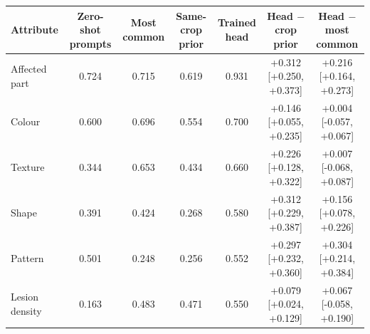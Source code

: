 \begin{tabular}{lcccccc}\toprule Attribute & Zero-shot prompts & Most common & Same-crop prior & Trained head & Head $-$ crop prior & Head $-$ most common\\\midrule
Affected part & 0.724 & 0.715 & 0.619 & 0.931 & +0.312 [+0.250, +0.373] & +0.216 [+0.164, +0.273]\\
Colour & 0.600 & 0.696 & 0.554 & 0.700 & +0.146 [+0.055, +0.235] & +0.004 [-0.057, +0.067]\\
Texture & 0.344 & 0.653 & 0.434 & 0.660 & +0.226 [+0.128, +0.322] & +0.007 [-0.068, +0.087]\\
Shape & 0.391 & 0.424 & 0.268 & 0.580 & +0.312 [+0.229, +0.387] & +0.156 [+0.078, +0.226]\\
Pattern & 0.501 & 0.248 & 0.256 & 0.552 & +0.297 [+0.232, +0.360] & +0.304 [+0.214, +0.384]\\
Lesion density & 0.163 & 0.483 & 0.471 & 0.550 & +0.079 [+0.024, +0.129] & +0.067 [-0.058, +0.190]\\
\bottomrule\end{tabular}
